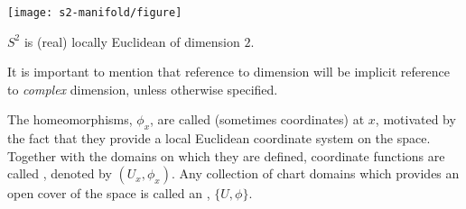 \begin{marginfigure}[-3\baselineskip]
	\centering
	\texttt{[image: s2-manifold/figure]}
	\caption{$ S^2 $ is (real) locally Euclidean of dimension $ 2 $.}
\end{marginfigure}

\begin{remark}
	It is important to mention that reference to dimension will be implicit reference
	to \textit{complex} dimension, unless otherwise specified.
\end{remark}

The homeomorphisms, $ \phi_x $, are called 
(sometimes coordinates) at $ x $, motivated by the fact that they provide a
local Euclidean coordinate system on the space. Together with the domains on
which they are defined, coordinate functions are called ,
denoted by $ (U_x, \phi_x) $. Any collection of chart domains which provides an
open cover of the space is called an , $ \{ U, \phi \} $.

